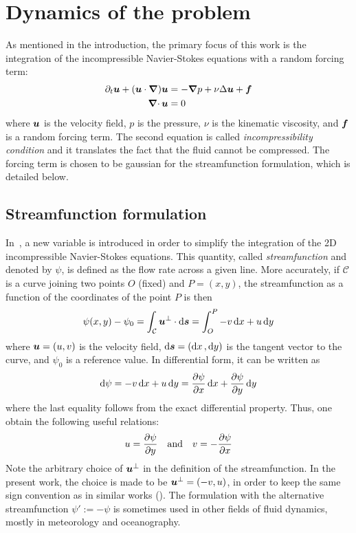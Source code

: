 \documentclass[../main.tex]{subfiles}
\begin{document}
\section{Dynamics of the problem}
As mentioned in the introduction, the primary focus of this work is the integration of the incompressible Navier-Stokes equations with a random forcing term:
\begin{align}
	\label{eq:navier-stokes}\partial_t \boldsymbol{u} + (\boldsymbol{u} \cdot \grad) \boldsymbol{u} & = -\grad p + \nu\Delta \boldsymbol{u} + \boldsymbol{f} \\
	\label{eq:incompressibility}\operatorname{\boldsymbol{\nabla}\cdot}{\boldsymbol{u}}                               & = 0
\end{align}
where $\boldsymbol{u}$ is the velocity field, $p$ is the pressure, $\nu$ is the kinematic viscosity, and $\boldsymbol{f}$ is a random forcing term. The second equation is called	\emph{incompressibility condition} and it translates the fact that the fluid cannot be compressed.
The forcing term is chosen to be gaussian for the streamfunction formulation, which is detailed below.

\subsection{Streamfunction formulation}
In~\cite{Batchelor2000}, a new variable is introduced in order to simplify the integration of the 2D incompressible Navier-Stokes equations. This quantity, called \emph{streamfunction} and denoted by $\psi$, is defined as the flow rate across a given line. More accurately, if $\mathcal{C}$ is a curve joining two points $O$ (fixed) and $P=(x,y)$, the streamfunction as a function of the coordinates of the point $P$ is then
\begin{equation}
	\psi(x,y) -\psi_0 = \int_{\mathcal{C}} \boldsymbol{u}^\perp \cdot \dd{\boldsymbol{s}}= \int_{O}^{P} -v \dd{x} + u \dd{y}
\end{equation}
where $\boldsymbol{u} = (u,v)$ is the velocity field, $\dd{\boldsymbol{s}}=(\dd{x},\dd{y})$ is the tangent vector to the curve, and $\psi_0$ is a reference value. In differential form, it can be written as
\begin{equation}
	\dd{\psi} = -v \dd{x} + u \dd{y} = \pdv{\psi}{x} \dd{x} + \pdv{\psi}{y} \dd{y}
\end{equation}
where the last equality follows from the exact differential property. Thus, one obtain the following useful relations:
\begin{equation}
	u = \pdv{\psi}{y} \quad \text{and} \quad v = -\pdv{\psi}{x}
\end{equation}
Note the arbitrary choice of $\boldsymbol{u}^\perp$ in the definition of the streamfunction. In the present work, the choice is made to be $\boldsymbol{u}^\perp = (-v,u)$, in order to keep the same sign convention as in similar works (\cite{2dturbulence,alexakisLONG}). The formulation with the alternative streamfunction $\psi':=-\psi$ is sometimes used in other fields of fluid dynamics, mostly in meteorology and oceanography.
\end{document}
